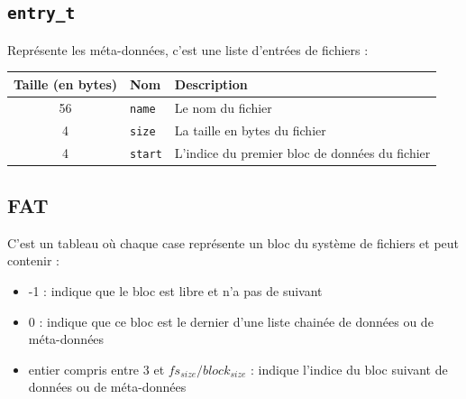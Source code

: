 \documentclass[a4paper, 12pt]{article}
\begin{document}
\subsection{\texttt{entry_t}} Représente les méta-données, c'est une liste d'entrées de fichiers :

\begin{tabular}{|c|l|p{.5\linewidth}|}	\hline
	\textbf{Taille (en bytes)}	& \textbf{Nom} & \textbf{Description} \\ \hline
	56	& \texttt{name} 	& Le nom du fichier \\ \hline
	4 	& \texttt{size} 	& La taille en bytes du fichier \\ \hline
	4 	& \texttt{start} & L'indice du premier bloc de données du fichier \\ \hline
\end{tabular}

\newpage
\subsection{FAT} C'est un tableau où chaque case représente un bloc du système de fichiers et peut contenir :
\begin{itemize}
	\item -1 : indique que le bloc est libre et n'a pas de suivant
	\item 0 : indique que ce bloc est le dernier d'une liste chainée de données ou de méta-données
	\item entier compris entre 3 et $fs_{size} / block_{size}$ : indique l'indice du bloc suivant de données ou de méta-données
\end{itemize}
\end{document}
